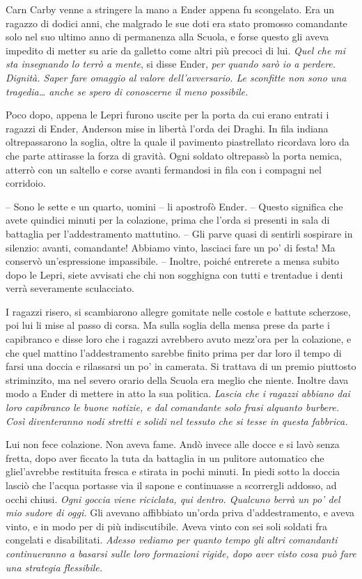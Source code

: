 {Carn Carby venne a stringere la mano a Ender appena fu scongelato. Era
	un ragazzo di dodici anni, che malgrado le sue doti era stato promosso
	comandante solo nel suo ultimo anno di permanenza alla Scuola, e forse
	questo gli aveva impedito di metter su arie da galletto come altri più
	precoci di lui. \emph{Quel che mi sta insegnando lo terrò a mente},
	\emph{} si disse Ender, \emph{per quando sarò io a perdere. Dignità.
		Saper fare omaggio al valore dell'avversario. Le sconfitte non sono una
		tragedia\ldots{} anche se spero di conoscerne il meno possibile.}}

{Poco dopo, appena le Lepri furono uscite per la porta da cui erano
	entrati i ragazzi di Ender, Anderson mise in libertà l'orda dei Draghi.
	In fila indiana oltrepassarono la soglia, oltre la quale il pavimento
	piastrellato ricordava loro da che parte attirasse la forza di gravità.
	Ogni soldato oltrepassò la porta nemica, atterrò con un saltello e corse
	avanti fermandosi in fila con i compagni nel corridoio.}

{-- Sono le sette e un quarto, uomini -- li apostrofò Ender. -- Questo
	significa che avete quindici minuti per la colazione, prima che l'orda
	si presenti in sala di battaglia per l'addestramento mattutino. -- Gli
	parve quasi di sentirli sospirare in silenzio: avanti, comandante!
	Abbiamo vinto, lasciaci fare un po' di festa! Ma conservò un'espressione
	impassibile. -- Inoltre, poiché entrerete a mensa subito dopo le Lepri,
	siete avvisati che chi non sogghigna con tutti e trentadue i denti verrà
	severamente sculacciato.}

{I ragazzi risero, si scambiarono allegre gomitate nelle costole e
	battute scherzose, poi lui li mise al passo di corsa. Ma sulla soglia
	della mensa prese da parte i capibranco e disse loro che i ragazzi
	avrebbero avuto mezz'ora per la colazione, e che quel mattino
	l'addestramento sarebbe finito prima per dar loro il tempo di farsi una
	doccia e rilassarsi un po' in camerata. Si trattava di un premio
	piuttosto striminzito, ma nel severo orario della Scuola era meglio che
	niente. Inoltre dava modo a Ender di mettere in atto la sua politica.
	\emph{Lascia che i ragazzi abbiano dai loro capibranco le buone notizie,
		e dal comandante solo frasi alquanto burbere. Così diventeranno nodi
		stretti e solidi nel tessuto che si tesse in questa fabbrica.}}

{Lui non fece colazione. Non aveva fame. Andò invece alle docce e si
	lavò senza fretta, dopo aver ficcato la tuta da battaglia in un pulitore
	automatico che gliel'avrebbe restituita fresca e stirata in pochi
	minuti. In piedi sotto la doccia lasciò che l'acqua portasse via il
	sapone e continuasse a scorrergli addosso, ad occhi chiusi. \emph{Ogni
		goccia viene riciclata, qui dentro. Qualcuno berrà un po' del mio sudore
		di oggi.} Gli avevano affibbiato un'orda priva d'addestramento, e aveva
	vinto, e in modo per di più indiscutibile. Aveva vinto con sei soli
	soldati fra congelati e disabilitati. \emph{Adesso vediamo per quanto
		tempo gli altri comandanti continueranno a basarsi sulle loro formazioni
		rigide, dopo aver visto cosa può fare una strategia flessibile.}}

